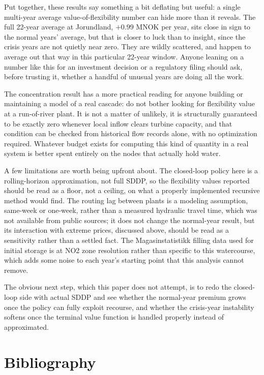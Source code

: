 \documentclass[11pt]{article}
\begin{document}
Put together, these results say something a bit deflating but useful: a single multi-year average value-of-flexibility number can hide more than it reveals. The full 22-year average at Jorundland, $+0.99$ MNOK per year, sits close in sign to the normal years' average, but that is closer to luck than to insight, since the crisis years are not quietly near zero. They are wildly scattered, and happen to average out that way in this particular 22-year window. Anyone leaning on a number like this for an investment decision or a regulatory filing should ask, before trusting it, whether a handful of unusual years are doing all the work.

The concentration result has a more practical reading for anyone building or maintaining a model of a real cascade: do not bother looking for flexibility value at a run-of-river plant. It is not a matter of unlikely, it is structurally guaranteed to be exactly zero whenever local inflow clears turbine capacity, and that condition can be checked from historical flow records alone, with no optimization required. Whatever budget exists for computing this kind of quantity in a real system is better spent entirely on the nodes that actually hold water.

A few limitations are worth being upfront about. The closed-loop policy here is a rolling-horizon approximation, not full SDDP, so the flexibility values reported should be read as a floor, not a ceiling, on what a properly implemented recursive method would find. The routing lag between plants is a modeling assumption, same-week or one-week, rather than a measured hydraulic travel time, which was not available from public sources; it does not change the normal-year result, but its interaction with extreme prices, discussed above, should be read as a sensitivity rather than a settled fact. The Magasinstatistikk filling data used for initial storage is at NO2 zone resolution rather than specific to this watercourse, which adds some noise to each year's starting point that this analysis cannot remove.

The obvious next step, which this paper does not attempt, is to redo the closed-loop side with actual SDDP and see whether the normal-year premium grows once the policy can fully exploit recourse, and whether the crisis-year instability softens once the terminal value function is handled properly instead of approximated.

\section*{Bibliography}
\end{document}
